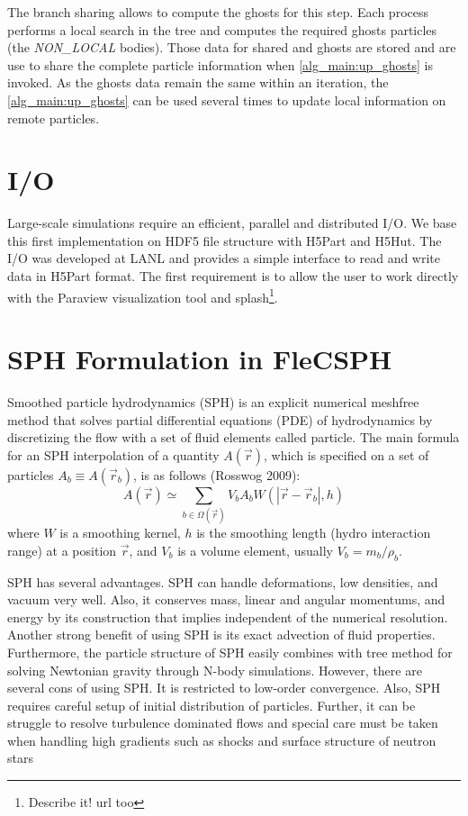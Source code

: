 \documentclass{article}
\begin{document}
The branch sharing allows to compute the ghosts for this step.
Each process performs a local search in the tree and computes the required
ghosts particles (the \textit{NON\_LOCAL} bodies).
Those data for shared and ghosts are stored and are use to share the complete
particle information when \ref{alg_main:up_ghosts} is invoked.
As the ghosts data remain the same within an iteration, the
\ref{alg_main:up_ghosts} can be used several times to update local information
on remote particles.

\section{I/O}
Large-scale simulations require an efficient, parallel and distributed I/O.
We base this first implementation on HDF5 file structure with H5Part and H5Hut.
The I/O was developed at LANL and provides a simple interface to read and write
data in H5Part format.
The first requirement is to allow the user to work directly with the Paraview
visualization tool and splash\footnote{Describe it! url too}.


\section{SPH Formulation in FleCSPH}
Smoothed particle hydrodynamics (SPH) is an explicit numerical meshfree method
that solves partial differential equations (PDE) of hydrodynamics by
discretizing the flow with a set of fluid elements called particle. 
The main formula for an SPH interpolation of a quantity $A(\vec{r})$, which is
specified on a set of particles $A_b \equiv A(\vec{r}_b)$, is as follows 
(Rosswog 2009):
\begin{equation}
A(\vec{r}) \simeq \sum_{b\in\Omega(\vec{r})} V_b A_b W(|\vec{r}-\vec{r}_b|,h)
\end{equation}
where $W$ is a smoothing kernel, 
$h$ is the smoothing length (hydro interaction range) at a position $\vec{r}$, 
and $V_b$ is a volume element, usually $V_b = m_b/\rho_b$.

SPH has several advantages. SPH can handle deformations, low densities, and vacuum very well. Also, it conserves mass, linear and angular momentums, and energy by its construction that implies independent of the numerical resolution. Another strong benefit of using SPH is its exact advection of fluid properties. Furthermore, the particle structure of SPH easily combines with tree method for solving Newtonian gravity through N-body simulations.
However, there are several cons of using SPH. It is restricted to low-order convergence. Also, SPH requires careful setup of initial distribution of particles. Further, it can be struggle to resolve turbulence dominated flows and special care must be taken when handling high gradients such as shocks and surface structure of neutron stars
\end{document}
